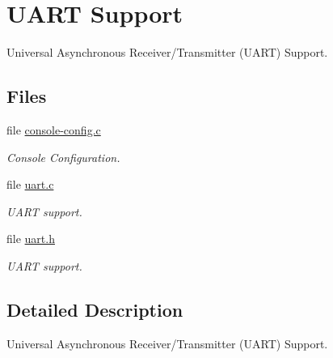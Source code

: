 \hypertarget{group__generic__or1k__uart}{}\section{U\+A\+RT Support}
\label{group__generic__or1k__uart}


Universal Asynchronous Receiver/\+Transmitter (U\+A\+RT) Support.  


\subsection*{Files}
\begin{DoxyCompactItemize}
\item 
file \mbox{\hyperlink{or1k_2generic__or1k_2console_2console-config_8c}{console-\/config.\+c}}
\begin{DoxyCompactList}\small\item\em Console Configuration. \end{DoxyCompactList}\item 
file \mbox{\hyperlink{or1k_2generic__or1k_2console_2uart_8c}{uart.\+c}}
\begin{DoxyCompactList}\small\item\em U\+A\+RT support. \end{DoxyCompactList}\item 
file \mbox{\hyperlink{or1k_2generic__or1k_2include_2bsp_2uart_8h}{uart.\+h}}
\begin{DoxyCompactList}\small\item\em U\+A\+RT support. \end{DoxyCompactList}\end{DoxyCompactItemize}


\subsection{Detailed Description}
Universal Asynchronous Receiver/\+Transmitter (U\+A\+RT) Support. 

